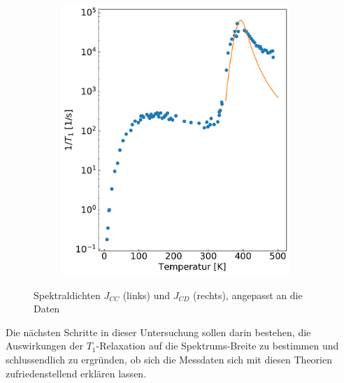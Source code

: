 \begin{figure}[H]
\begin{subfigure}{0.49\textwidth}
		\includegraphics[width=0.95\textwidth]{graphics/zwischenbericht/J_cd.pdf}
	\end{subfigure}
	\caption{Spektraldichten $J_{CC}$ (links) und $J_{CD}$ (rechts), angepasst an die Daten}
	\label{fig:j_cc_j_cd}
\end{figure}

Die nächsten Schritte in dieser Untersuchung sollen darin bestehen, die Auswirkungen der $T_1$-Relaxation auf die Spektrums-Breite zu bestimmen und schlussendlich zu ergründen, ob sich die Messdaten sich mit diesen Theorien zufriedenstellend erklären lassen.




